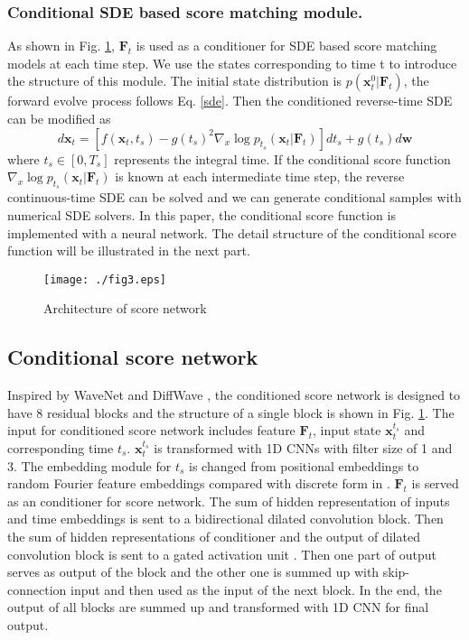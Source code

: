\subsubsection{Conditional SDE based score matching module.} As shown in Fig. \ref{ScoreNet}, $\textbf{F}_t$ is used as a conditioner for SDE based score matching models at each time step. We use the states corresponding to time t to introduce the structure of this module. The initial state distribution is $p(\textbf{x}_t^0|\textbf{F}_t)$, the forward evolve process follows Eq. \ref{sde}. Then the conditioned reverse-time SDE can be modified as
\begin{equation}\label{crsde}
	d\textbf{x}_t = [f(\textbf{x}_t,t_s)-g(t_s)^2\nabla_x \log p_{t_s}(\textbf{x}_t|\textbf{F}_{t})]dt_s + g(t_s)d\textbf{w}
\end{equation}
where $t_s\in [0, T_s]$ represents the integral time. If the conditional score function $\nabla_x \log p_{t_s}(\textbf{x}_t|\textbf{F}_{t})$ is known at each intermediate time step, the reverse continuous-time SDE can be solved and we can generate conditional samples with numerical SDE solvers. In this paper, the conditional score function is implemented with a neural network. The detail structure of the conditional score function will be illustrated in the next part.

\begin{figure}[t]
	\centering
	\texttt{[image: ./fig3.eps]} 
	\caption{Architecture of score network}
	\label{ScoreNet}
\end{figure}

\subsection{Conditional score network} 
Inspired by WaveNet \cite{oord2016wavenet} and DiffWave \cite{kong2020diffwave}, the conditioned score network is designed to have 8 residual blocks and the structure of a single block is shown in Fig. \ref{ScoreNet}. The input for conditioned score network includes feature $\textbf{F}_t$, input state $\textbf{x}_{t}^{t_s}$ and corresponding time $t_s$. $\textbf{x}_{t}^{t_s}$ is transformed with 1D CNNs with filter size of 1 and 3. The embedding module for $t_s$ is changed from positional embeddings \cite{vaswani2017attention} to random Fourier feature embeddings \cite{tancik2020fourier} compared with discrete form in \cite{ho2020denoising}. $\textbf{F}_t$ is served as an conditioner for score network. The sum of hidden representation of inputs and time embeddings is sent to a bidirectional dilated convolution block. Then the sum of hidden representations of conditioner and the output of dilated convolution block is sent to a gated activation unit \cite{oord2016wavenet}. Then one part of output serves as output of the block and the other one is summed up with skip-connection input and then used as the input of the next block. In the end, the output of all blocks are summed up and transformed with 1D CNN for final output.

